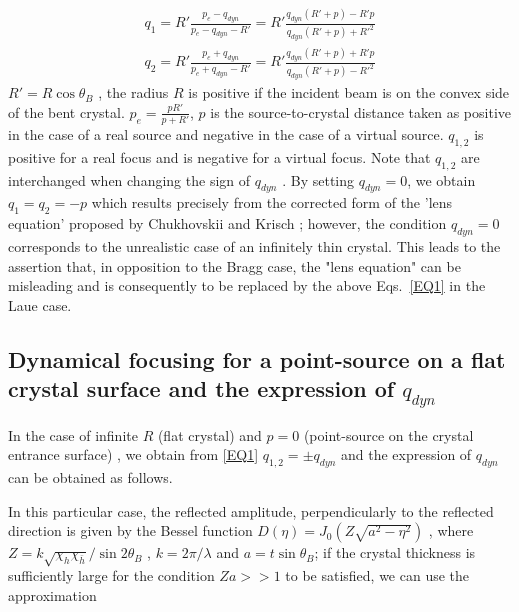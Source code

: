 \documentclass{iucr}              %
\begin{document}
\begin{subequations}
\label{EQ1}
\begin{eqnarray}
{q_1} = R'\frac{{{p_e} - {q_{dyn}}}}{{{p_e} - {q_{dyn}} - R'}} = R'\frac{{{q_{dyn}}(R' + p) - R'p}}{{{q_{dyn}}(R' + p) + {{R'}^2}}} \\
{q_2} = R'\frac{{{p_e} + {q_{dyn}}}}{{{p_e} + {q_{dyn}} - R'}} = R'\frac{{{q_{dyn}}(R' + p) + R'p}}{{{q_{dyn}}(R' + p) - {{R'}^2}}}
\end{eqnarray}
\end{subequations}
$R' = R\cos {\theta _B}$ , the radius $R$ is positive if the incident beam is on the convex side of the bent crystal.  ${p_e} = \frac{{pR'}}{{p + R'}}$, $ p$ is the source-to-crystal distance taken as positive in the case of a real source and negative in the case of a virtual source.  ${q_{1,2}}$  is positive for a real focus and is negative for a virtual focus. Note that  ${q_{1,2}}$ are interchanged when changing the sign of $q_{dyn}$ . By setting $q_{dyn}=0$, we obtain $q_1=q_2=-p$  which results precisely from the corrected form of the 'lens equation' proposed by Chukhovskii and Krisch \cite{CK}; however, the condition  $q_{dyn}=0$ corresponds to the unrealistic case of an infinitely thin crystal. This leads to the assertion  that, in opposition to the Bragg case, the "lens equation" can be misleading and is consequently to be replaced by the above Eqs.~\ref{EQ1} in the Laue case. 


\subsection{Dynamical focusing for a point-source on a flat crystal surface and the expression of  $q_{dyn}$}

In the case of infinite $R$ (flat crystal) and   $p=0$ (point-source on the crystal entrance surface) ,  we obtain from \ref{EQ1} ${q_{1,2}} =  \pm {q_{dyn}}$ and the expression of   $q_{dyn}$ can be obtained as follows.

In this particular case, the reflected amplitude, perpendicularly to the reflected direction is given by the Bessel function $D(\eta ) = {J_0}(Z\sqrt {{a^2} - {\eta ^2}} )$ , where  $Z = k\sqrt {{\chi _h}{\chi _{\bar h}}} /\sin 2{\theta _B}$ , $k = 2\pi /\lambda $  and   $a = t\sin {\theta _B}$; if  the crystal thickness is sufficiently  large for the condition   $Za >  > 1$  to be satisfied, we can use the approximation
\end{document}

